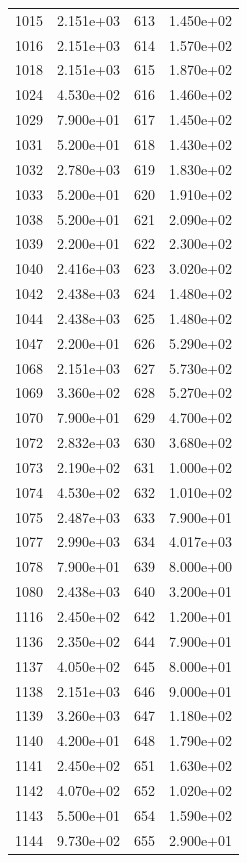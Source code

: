 \documentclass[12pt]{article}
\begin{document}
\begin{longtable}{@{}cccc@{}}
1015 & 2.151e+03 & 613 & 1.450e+02 \\
1016 & 2.151e+03 & 614 & 1.570e+02 \\
1018 & 2.151e+03 & 615 & 1.870e+02 \\
1024 & 4.530e+02 & 616 & 1.460e+02 \\
1029 & 7.900e+01 & 617 & 1.450e+02 \\
1031 & 5.200e+01 & 618 & 1.430e+02 \\
1032 & 2.780e+03 & 619 & 1.830e+02 \\
1033 & 5.200e+01 & 620 & 1.910e+02 \\
1038 & 5.200e+01 & 621 & 2.090e+02 \\
1039 & 2.200e+01 & 622 & 2.300e+02 \\
1040 & 2.416e+03 & 623 & 3.020e+02 \\
1042 & 2.438e+03 & 624 & 1.480e+02 \\
1044 & 2.438e+03 & 625 & 1.480e+02 \\
1047 & 2.200e+01 & 626 & 5.290e+02 \\
1068 & 2.151e+03 & 627 & 5.730e+02 \\
1069 & 3.360e+02 & 628 & 5.270e+02 \\
1070 & 7.900e+01 & 629 & 4.700e+02 \\
1072 & 2.832e+03 & 630 & 3.680e+02 \\
1073 & 2.190e+02 & 631 & 1.000e+02 \\
1074 & 4.530e+02 & 632 & 1.010e+02 \\
1075 & 2.487e+03 & 633 & 7.900e+01 \\
1077 & 2.990e+03 & 634 & 4.017e+03 \\
1078 & 7.900e+01 & 639 & 8.000e+00 \\
1080 & 2.438e+03 & 640 & 3.200e+01 \\
1116 & 2.450e+02 & 642 & 1.200e+01 \\
1136 & 2.350e+02 & 644 & 7.900e+01 \\
1137 & 4.050e+02 & 645 & 8.000e+01 \\
1138 & 2.151e+03 & 646 & 9.000e+01 \\
1139 & 3.260e+03 & 647 & 1.180e+02 \\
1140 & 4.200e+01 & 648 & 1.790e+02 \\
1141 & 2.450e+02 & 651 & 1.630e+02 \\
1142 & 4.070e+02 & 652 & 1.020e+02 \\
1143 & 5.500e+01 & 654 & 1.590e+02 \\
1144 & 9.730e+02 & 655 & 2.900e+01 \\

\end{longtable}
\end{document}
